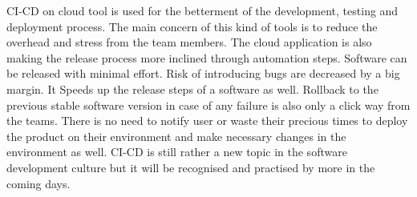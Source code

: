 CI-CD on cloud tool is used for the betterment of the development, testing and deployment process. The main concern of this kind of tools is to reduce the overhead and stress from the team members. The cloud application is also making the release process more inclined through automation steps. Software can be released with minimal effort. Risk of introducing bugs are decreased by a big margin. It Speeds up the release steps of a software as well. Rollback to the previous stable software version in case of any failure is also only a click way from the teams. There is no need to notify user or waste their precious times to deploy the product on their environment and make necessary changes in the environment as well. CI-CD is still rather a new topic in the software development culture but it will be recognised and practised by more in the coming days.